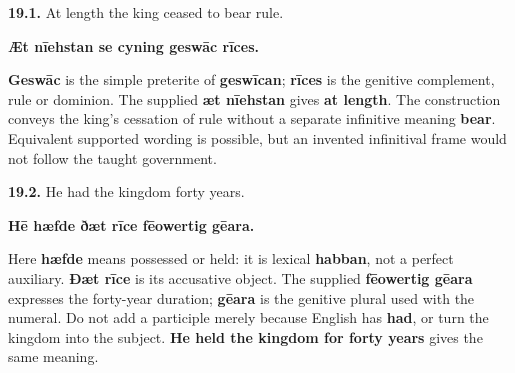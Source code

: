 \par\begin{minipage}{\linewidth}\raggedright
\textbf{19.1.} At length the king ceased to bear rule.

\textbf{Æt nīehstan se cyning geswāc rīces.}

\textbf{Geswāc} is the simple preterite of \textbf{geswīcan}; \textbf{rīces} is the genitive complement, rule or dominion. The supplied \textbf{æt nīehstan} gives \textbf{at length}. The construction conveys the king's cessation of rule without a separate infinitive meaning \textbf{bear}. Equivalent supported wording is possible, but an invented infinitival frame would not follow the taught government.

\end{minipage}\par\addvspace{4pt}

\par\begin{minipage}{\linewidth}\raggedright
\textbf{19.2.} He had the kingdom forty years.

\textbf{Hē hæfde ðæt rīce fēowertig gēara.}

Here \textbf{hæfde} means possessed or held: it is lexical \textbf{habban}, not a perfect auxiliary. \textbf{Ðæt rīce} is its accusative object. The supplied \textbf{fēowertig gēara} expresses the forty-year duration; \textbf{gēara} is the genitive plural used with the numeral. Do not add a participle merely because English has \textbf{had}, or turn the kingdom into the subject. \textbf{He held the kingdom for forty years} gives the same meaning.

\end{minipage}\par\addvspace{4pt}

